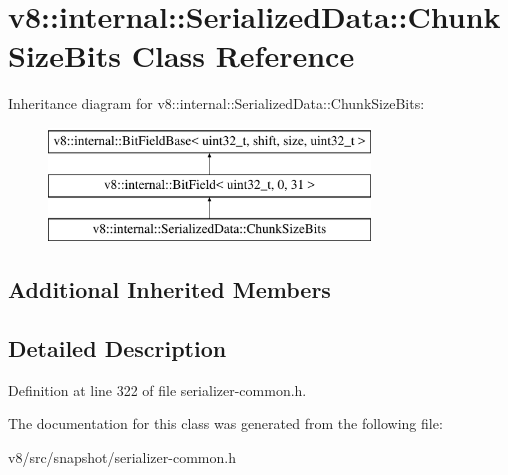 \hypertarget{classv8_1_1internal_1_1SerializedData_1_1ChunkSizeBits}{}\section{v8\+:\+:internal\+:\+:Serialized\+Data\+:\+:Chunk\+Size\+Bits Class Reference}
\label{classv8_1_1internal_1_1SerializedData_1_1ChunkSizeBits}
Inheritance diagram for v8\+:\+:internal\+:\+:Serialized\+Data\+:\+:Chunk\+Size\+Bits\+:\begin{figure}[H]
\begin{center}
\leavevmode
\includegraphics[height=3.000000cm]{classv8_1_1internal_1_1SerializedData_1_1ChunkSizeBits}
\end{center}
\end{figure}
\subsection*{Additional Inherited Members}


\subsection{Detailed Description}


Definition at line 322 of file serializer-\/common.\+h.



The documentation for this class was generated from the following file\+:\begin{DoxyCompactItemize}
\item 
v8/src/snapshot/serializer-\/common.\+h\end{DoxyCompactItemize}
